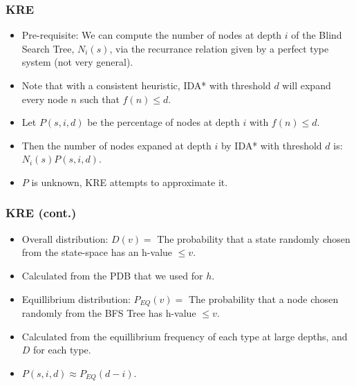\documentclass{beamer}
\begin{document}
\begin{frame}
  \frametitle{KRE}
  \begin{itemize}
  \item Pre-requisite: We can compute the number of nodes at depth \(i\) of the Blind Search Tree, \(N_i(s)\),
    via the recurrance relation given by a perfect type system (not very general).
  \item Note that with a consistent heuristic, IDA* with threshold \(d\) will expand
    every node \(n\) such that \(f(n) \leq d\).
  \item Let \(P(s,i, d)\) be the percentage of nodes at depth \(i\) with \(f(n) \leq d\).
  \item Then the number of nodes expaned at depth \(i\) by IDA* with threshold \(d\) is: \\
    \(N_i(s) P(s,i,d)\).
  \item \(P\) is unknown, KRE attempts to approximate it.
  \end{itemize}
\end{frame}

\begin{frame}
  \frametitle{KRE (cont.)}
  \begin{itemize}
\item Overall distribution: \(D(v) = \) The probability that a state randomly chosen from the state-space has an h-value \(\leq v\).
  \item Calculated from the PDB that we used for \(h\).
  \item Equillibrium distribution: \(P_{EQ}(v) = \) The probability that a node chosen randomly from the BFS Tree has h-value \(\leq v\).
  \item Calculated from the equillibrium frequency of each type at large depths, and \(D\) for each type.
  \item \( P(s,i, d) \approx P_{EQ}(d - i) \).
  \end{itemize}
\end{frame}
\end{document}
